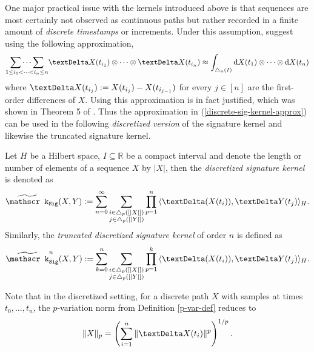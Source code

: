 \documentclass[openany]{book}
\begin{document}
\par One major practical issue with the kernels
introduced above is that sequences are most certainly not observed as continuous paths but rather recorded in a finite amount of \textit{discrete timestamps} or increments. Under this assumption, \cite{kiraly2019} suggest using the following approximation,
\begin{equation}\label{discrete-sig-kernel-approx}
    \underset{1\leq i_1<\cdots<i_n\leq n}{\sum\cdots \sum}\gDelta X(t_{i_1})\otimes \cdots \otimes \gDelta X(t_{i_n})\approx\int_{\triangle_n(I)}\mathrm dX(t_1)\otimes \cdots\otimes \mathrm dX(t_n)
\end{equation}
where $\gDelta X(t_{i_j}):=X(t_{i_{j}})-X(t_{i_{j-1}})$ for every $j\in [n]$ are the first-order differences of $X$. Using this approximation is in fact justified, which was shown in Theorem 5 of \cite{kiraly2019}. 
Thus the approximation in (\ref{discrete-sig-kernel-approx}) can be used in the following \textit{discretized version} of the signature kernel and likewise the truncated signature kernel.
\begin{definition}
    Let $H$ be a Hilbert space, $I\subseteq \mathbb R$ be a compact interval and denote the length or number of elements of a sequence $X$ by $\vert X\vert$, then the \textit{discretized signature kernel} is denoted as
    \begin{equation*}
        \widetilde{\mathscr k}_{\mathtt{Sig}}(X,Y):=\sum_{n=0}^\infty\sum_{\substack{i\in \triangle_p([\vert X\vert])\\j\in \triangle_p([\vert Y\vert])}}\prod_{p=1}^n \,\langle\gDelta(X(t_i)), \gDelta Y(t_j)\rangle_H.
    \end{equation*}
    Similarly, the \textit{truncated discretized signature kernel} of order $n$ is defined as
    \begin{equation*}
        \widetilde{\mathscr k}^n_{\mathtt{Sig}}(X,Y):=\sum_{k=0}^n\sum_{\substack{i\in \triangle_p([\vert X\vert])\\j\in \triangle_p([\vert Y\vert])}}\prod_{p=1}^k \,\langle\gDelta(X(t_i)), \gDelta Y(t_j)\rangle_H.
    \end{equation*}
\end{definition}
Note that in the discretized setting, for a discrete path $X$ with samples at times $t_0,\dots,t_n$, the $p$-variation norm from Definition \ref{p-var-def} reduces to
\begin{equation*}
    \|X\|_{p}=\left(\sum_{i=1}^n\|\gDelta X(t_i)\|^p\right)^{1/p}.
\end{equation*}
\end{document}
